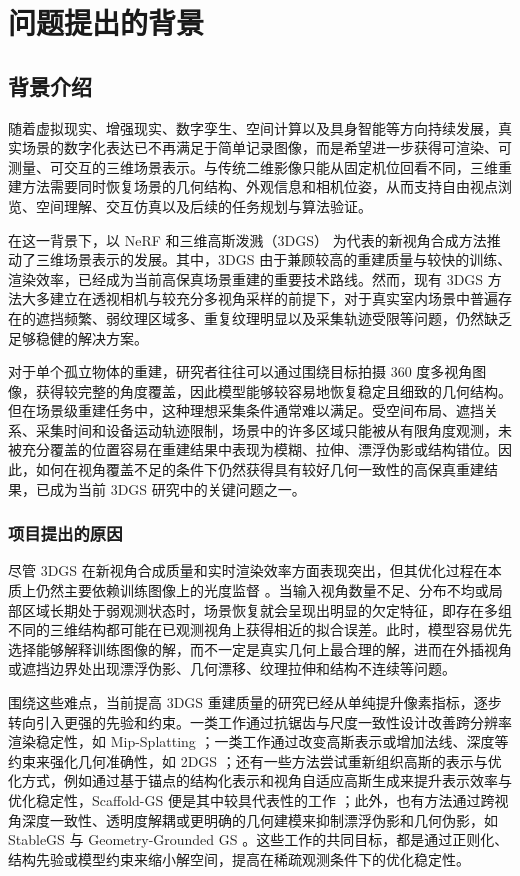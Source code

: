 \section{问题提出的背景}

\subsection{背景介绍}

随着虚拟现实、增强现实、数字孪生、空间计算以及具身智能等方向持续发展，真实场景的数字化表达已不再满足于简单记录图像，而是希望进一步获得可渲染、可测量、可交互的三维场景表示。与传统二维影像只能从固定机位回看不同，三维重建方法需要同时恢复场景的几何结构、外观信息和相机位姿，从而支持自由视点浏览、空间理解、交互仿真以及后续的任务规划与算法验证。

在这一背景下，以 NeRF \cite{mildenhall2021nerf} 和三维高斯泼溅（3DGS）\cite{kerbl2023} 为代表的新视角合成方法推动了三维场景表示的发展。其中，3DGS 由于兼顾较高的重建质量与较快的训练、渲染效率，已经成为当前高保真场景重建的重要技术路线。然而，现有 3DGS 方法大多建立在透视相机与较充分多视角采样的前提下，对于真实室内场景中普遍存在的遮挡频繁、弱纹理区域多、重复纹理明显以及采集轨迹受限等问题，仍然缺乏足够稳健的解决方案。

对于单个孤立物体的重建，研究者往往可以通过围绕目标拍摄 360 度多视角图像，获得较完整的角度覆盖，因此模型能够较容易地恢复稳定且细致的几何结构。但在场景级重建任务中，这种理想采集条件通常难以满足。受空间布局、遮挡关系、采集时间和设备运动轨迹限制，场景中的许多区域只能被从有限角度观测，未被充分覆盖的位置容易在重建结果中表现为模糊、拉伸、漂浮伪影或结构错位。因此，如何在视角覆盖不足的条件下仍然获得具有较好几何一致性的高保真重建结果，已成为当前 3DGS 研究中的关键问题之一。

\subsubsection{项目提出的原因}

尽管 3DGS 在新视角合成质量和实时渲染效率方面表现突出，但其优化过程在本质上仍然主要依赖训练图像上的光度监督 \cite{kerbl2023}。当输入视角数量不足、分布不均或局部区域长期处于弱观测状态时，场景恢复就会呈现出明显的欠定特征，即存在多组不同的三维结构都可能在已观测视角上获得相近的拟合误差。此时，模型容易优先选择能够解释训练图像的解，而不一定是真实几何上最合理的解，进而在外插视角或遮挡边界处出现漂浮伪影、几何漂移、纹理拉伸和结构不连续等问题。

围绕这些难点，当前提高 3DGS 重建质量的研究已经从单纯提升像素指标，逐步转向引入更强的先验和约束。一类工作通过抗锯齿与尺度一致性设计改善跨分辨率渲染稳定性，如 Mip-Splatting \cite{yu2024mipsplatting}；一类工作通过改变高斯表示或增加法线、深度等约束来强化几何准确性，如 2DGS \cite{huang2024twodgs}；还有一些方法尝试重新组织高斯的表示与优化方式，例如通过基于锚点的结构化表示和视角自适应高斯生成来提升表示效率与优化稳定性，Scaffold-GS 便是其中较具代表性的工作 \cite{lu2024scaffold}；此外，也有方法通过跨视角深度一致性、透明度解耦或更明确的几何建模来抑制漂浮伪影和几何伪影，如 StableGS 与 Geometry-Grounded GS \cite{wang2025stablegs,zhang2026geometrygroundedgs}。这些工作的共同目标，都是通过正则化、结构先验或模型约束来缩小解空间，提高在稀疏观测条件下的优化稳定性。

